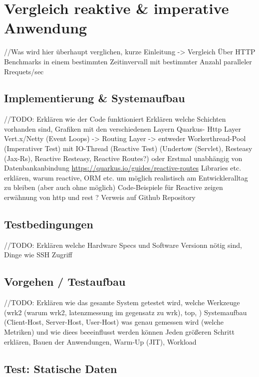 \section {Vergleich reaktive \& imperative Anwendung}
\label{section:vergleich_reaktiv_imperativ}
//Was wird hier überhaupt verglichen, kurze Einleitung  -> Vergleich Über HTTP Benchmarks in einem bestimmten Zeitinvervall mit bestimmter
Anzahl paralleler Rrequets/sec

\subsection{Implementierung \& Systemaufbau}
\label{section:implementierung}
//TODO: Erklären wie der Code funktioniert
Erklären welche Schichten vorhanden sind, Grafiken mit den verschiedenen Layern
Quarkus- Http Layer
Vert.x/Netty (Event Loops) -> Routing Layer -> entweder Workerthread-Pool (Imperativer Test) mit IO-Thread (Reactive Test)
(Undertow (Servlet), Resteasy (Jax-Rs), Reactive Resteasy, Reactive Routes?) oder
Erstmal unabhängig von Datenbankanbindung
\url{https://quarkus.io/guides/reactive-routes}
Libraries etc. erklären, warum reactive, ORM etc. um möglich realistisch am Entwickleralltag zu bleiben (aber auch ohne möglich)
Code-Beispiele für Reactive zeigen
erwähnung von http und rest ?
Verweis auf Github Repository

\subsection{Testbedingungen}
\label{section:testbedingungen}
//TODO: Erklären welche Hardware Specs und Software Versionn nötig sind, Dinge wie SSH Zugriff

\subsection{Vorgehen / Testaufbau}
\label{section:vorgehen}
//TODO: Erklären wie das gesamte System getestet wird, welche Werkzeuge (wrk2 (warum wrk2, latenzmessung im gegensatz zu wrk), top, )
Systemaufbau (Client-Host, Server-Host, User-Host)
was genau gemessen wird (welche Metriken) und wie
diees beeeinflusst werden können
Jeden größeren Schritt erklären, Bauen der Anwendungen, Warm-Up (JIT), Workload

\subsection{Test: Statische Daten}
\label{section:statische_daten}

